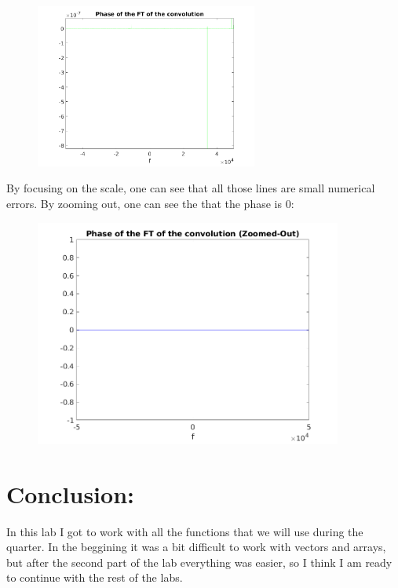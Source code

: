 \documentclass[a4paper,11pt]{article}
\begin{document}
\begin{figure}[!hp]
    \begin{center}
      \includegraphics[width=0.65\textwidth]{images/exercice_5c.png}
    \end{center}
\end{figure}

\newpage

By focusing on the scale, one can see that all those lines are small numerical errors. By zooming out, one can see the that the phase is 0:


\begin{figure}[!hp]
    \begin{center}
      \includegraphics[width=0.9\textwidth]{images/exercice_5c_f.png}
    \end{center}
\end{figure}

\section{Conclusion:}

In this lab I got to work with all the functions that we will use during the quarter. In the beggining it was a bit difficult to work with vectors and arrays, but after the second part of the lab everything was easier, so I think I am ready to continue with the rest of the labs.

\vspace{4cm}
\end{document}
